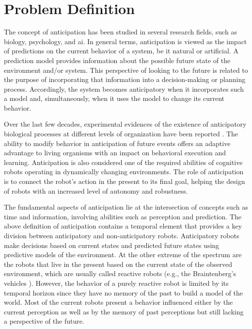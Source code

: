 \section{Problem Definition}

The concept of anticipation has been studied in several research fields, such as biology, psychology, and \acl{ai}. In general terms, anticipation is viewed as the impact of predictions on the current behavior of a system, be it natural or artificial. A prediction model provides information about the possible future state of the environment and/or system. This perspective of looking to the future is related to the purpose of incorporating that information into a decision-making or planning process. Accordingly, the system becomes anticipatory when it incorporates such a model and, simultaneously, when it uses the model to change its current behavior.

Over the last few decades, experimental evidences of the existence of anticipatory biological processes at different levels of organization have been reported \cite{Deans2021,Poli2010}. The ability to modify behavior in anticipation of future events offers an adaptive advantage to living organisms with an impact on behavioral execution and learning. Anticipation is also considered one of the required abilities of cognitive robots operating in dynamically changing environments. The role of anticipation is to connect the robot’s action in the present to its final goal, helping the design of robots with an increased level of autonomy and robustness.

The fundamental aspects of anticipation lie at the intersection of concepts such as time and information, involving abilities such as perception and prediction. The above definition of anticipation contains a temporal element that provides a key division between anticipatory and non-anticipatory robots. Anticipatory robots make decisions based on current states and predicted future states using predictive models of the environment. At the other extreme of the spectrum are the robots that live in the present based on the current state of the observed environment, which are usually called reactive robots (e.g., the Braintenberg’s vehicles \cite{Braitenberg1986}). However, the behavior of a purely reactive robot is limited by its temporal horizon since they have no memory of the past to build a model of the world. Most of the current robots present a behavior influenced either by the current perception as well as by the memory of past perceptions but still lacking a perspective of the future.

